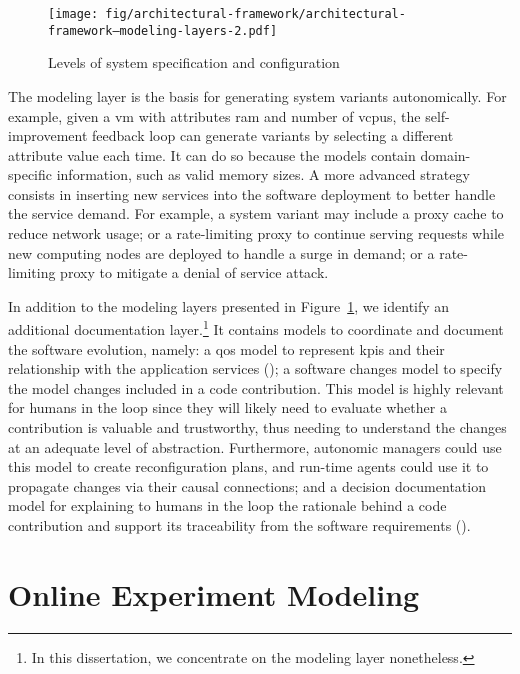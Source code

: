 \begin{figure}[h]
	\centering
	\texttt{[image: fig/architectural-framework/architectural-framework--modeling-layers-2.pdf]}
	\caption{Levels of system specification and configuration}
	\label{fig:architectural-framework--modeling-layers}
\end{figure}

The modeling layer is the basis for generating system variants autonomically. For example, given a \gls{vm} with attributes \gls{ram} and number of \glspl{vcpu}, the self-improvement feedback loop can generate variants by selecting a different attribute value each time. It can do so because the models contain domain-specific information, such as valid memory sizes. A more advanced strategy consists in inserting new services into the software deployment to better handle the service demand. For example, a system variant may include a proxy cache to reduce network usage; or a rate-limiting proxy to continue serving requests while new computing nodes are deployed to handle a surge in demand; or a rate-limiting proxy to mitigate a denial of service attack.

In addition to the modeling layers presented in Figure~\ref{fig:architectural-framework--modeling-layers}, we identify an additional documentation layer.\footnote{In this dissertation, we concentrate on the modeling layer nonetheless.} It contains models to coordinate and document the software evolution, namely: a \gls{qos} model to represent \glspl{kpi} and their relationship with the application services (); a software changes model to specify the model changes included in a code contribution. This model is highly relevant for humans in the loop since they will likely need to evaluate whether a contribution is valuable and trustworthy, thus needing to understand the changes at an adequate level of abstraction. Furthermore, autonomic managers could use this model to create reconfiguration plans, and run-time agents could use it to propagate changes via their causal connections; and a decision documentation model for explaining to humans in the loop the rationale behind a code contribution and support its traceability from the software requirements ().


\section{Online Experiment Modeling}
\label{sect:architectural-framework--online-experiment-design}

